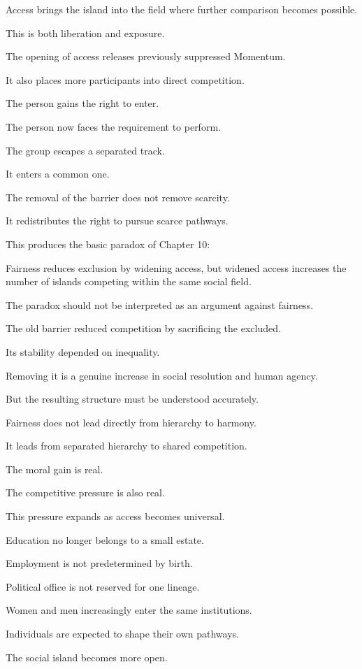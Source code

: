 Access brings the island into the field where further comparison becomes possible.

This is both liberation and exposure.

The opening of access releases previously suppressed Momentum.

It also places more participants into direct competition.

The person gains the right to enter.

The person now faces the requirement to perform.

The group escapes a separated track.

It enters a common one.

The removal of the barrier does not remove scarcity.

It redistributes the right to pursue scarce pathways.

This produces the basic paradox of Chapter 10:

Fairness reduces exclusion by widening access, but widened access increases the number of islands competing within the same social field.

The paradox should not be interpreted as an argument against fairness.

The old barrier reduced competition by sacrificing the excluded.

Its stability depended on inequality.

Removing it is a genuine increase in social resolution and human agency.

But the resulting structure must be understood accurately.

Fairness does not lead directly from hierarchy to harmony.

It leads from separated hierarchy to shared competition.

The moral gain is real.

The competitive pressure is also real.

This pressure expands as access becomes universal.

Education no longer belongs to a small estate.

Employment is not predetermined by birth.

Political office is not reserved for one lineage.

Women and men increasingly enter the same institutions.

Individuals are expected to shape their own pathways.

The social island becomes more open.


